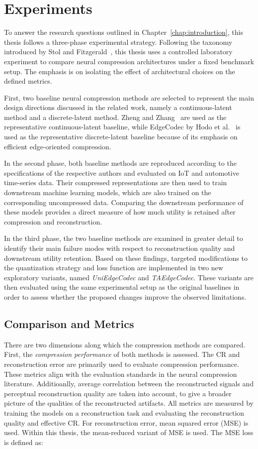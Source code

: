 \section{Experiments}

To answer the research questions outlined in Chapter~\ref{chap:introduction}, this thesis follows a three-phase experimental strategy. Following the taxonomy introduced by Stol and Fitzgerald~\cite{Stol2018}, this thesis uses a controlled laboratory experiment to compare neural compression architectures under a fixed benchmark setup. The emphasis is on isolating the effect of architectural choices on the defined metrics.

First, two baseline neural compression methods are selected to represent the main design directions discussed in the related work, namely a continuous-latent method and a discrete-latent method. Zheng and Zhang~\cite{Zheng2023} are used as the representative continuous-latent baseline, while EdgeCodec by Hodo et al.~\cite{Hodo2025} is used as the representative discrete-latent baseline because of its emphasis on efficient edge-oriented compression.

In the second phase, both baseline methods are reproduced according to the specifications of the respective authors and evaluated on IoT and automotive time-series data. Their compressed representations are then used to train downstream machine learning models, which are also trained on the corresponding uncompressed data. Comparing the downstream performance of these models provides a direct measure of how much utility is retained after compression and reconstruction.

In the third phase, the two baseline methods are examined in greater detail to identify their main failure modes with respect to reconstruction quality and downstream utility retention. Based on these findings, targeted modifications to the quantization strategy and loss function are implemented in two new exploratory variants, named \textit{UniEdgeCodec} and \textit{TAEdgeCodec}. These variants are then evaluated using the same experimental setup as the original baselines in order to assess whether the proposed changes improve the observed limitations.

\subsection{Comparison and Metrics} 

There are two dimensions along which the compression methods are compared. First, the \textit{compression performance} of both methods is assessed. The CR and reconstruction error are primarily used to evaluate compression performance. These metrics align with the evaluation standards in the neural compression literature. Additioanlly, average correlation between the reconstructed signals and perceptual reconstruction quality are taken into account, to give a broader picture of the qualities of the reconstructed artifacts. All metrics are measured by training the models on a reconstruction task and evaluating the reconstruction quality and effective CR. For reconstruction error, mean squared error (MSE) is used. Within this thesis, the mean-reduced variant of MSE is used. The MSE loss is defined as: 

